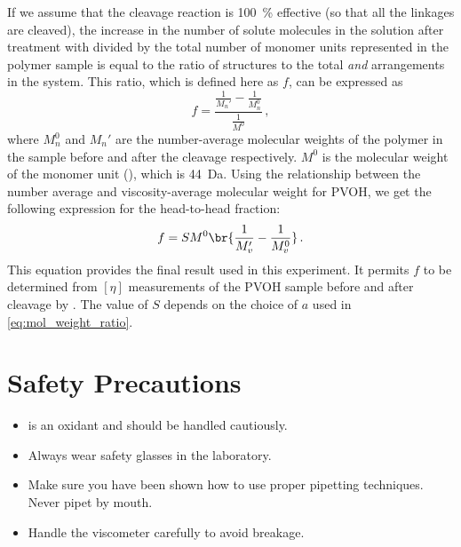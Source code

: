 If we assume that the cleavage reaction is \qty{100}{\percent} effective (so that all the  linkages are cleaved), the increase in the number of solute molecules in the solution after treatment with  divided by the total number of monomer units represented in the polymer sample is equal to the ratio of  structures to the total  \emph{and}  arrangements in the system. 
This ratio, which is defined here as \( f \), can be expressed as
\begin{equation}
	f = \frac{\frac{1}{M_n'} - \frac{1}{M_n^0}}{\frac{1}{M^0}} \, ,
	\label{eq:frac_glycol}
\end{equation}
where \( M_n^0 \) and \( M_n' \) are the number-average molecular weights of the polymer in the sample before
and after the  cleavage respectively. 
\( M^0 \) is the molecular weight of the monomer unit (), which is \qty{44}{\dalton}. 
Using the relationship between the number average and viscosity-average molecular weight for PVOH, we get the following expression for the head-to-head fraction:
\begin{equation}
	f = S M^0 \br{\frac{1}{M_v'} - \frac{1}{M_v^0}}\, .
	\label{eq:h2h_frac}
\end{equation}
This equation provides the final result used in this experiment. 
It permits \( f \) to be determined from \( [\eta] \) measurements of the PVOH sample before and after cleavage by . The value of \( S \) depends on the choice of \( a \) used in \cref{eq:mol_weight_ratio}.



\pagebreak

\section{Safety Precautions} %
\label{sec:safety}

\begin{itemize}
	\item {} is an oxidant and should be handled cautiously. 
	\item Always wear safety glasses in the laboratory.
	\item Make sure you have been shown how to use proper pipetting techniques. 
	Never pipet by mouth.
	\item Handle the viscometer carefully to avoid breakage. 
\end{itemize}


